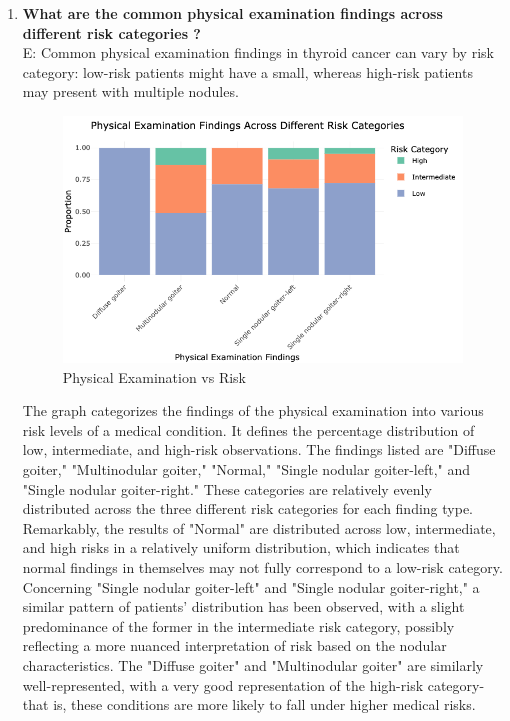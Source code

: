 \documentclass[12pt]{article}
\begin{document}
\begin{enumerate}
\newpage 

 \item \textbf{What are the common physical examination findings across different risk categories ?} \\
 E: Common physical examination findings in thyroid cancer can vary by risk category: low-risk patients might have a small, whereas high-risk patients may present with multiple nodules.

 \begin{figure}[h]
        \centering
        \includegraphics[width=1.1\textwidth]{physical vs risk.png}  
        \caption{Physical Examination vs Risk}
            \label{fig:example}
       \vspace{0.5cm}
    \end{figure}

The graph categorizes the findings of the physical examination into various risk levels of a medical condition. It defines the percentage distribution of low, intermediate, and high-risk observations. The findings listed are "Diffuse goiter," "Multinodular goiter," "Normal," "Single nodular goiter-left," and "Single nodular goiter-right." These categories are relatively evenly distributed across the three different risk categories for each finding type. Remarkably, the results of "Normal" are distributed across low, intermediate, and high risks in a relatively uniform distribution, which indicates that normal findings in themselves may not fully correspond to a low-risk category. Concerning "Single nodular goiter-left" and "Single nodular goiter-right," a similar pattern of patients' distribution has been observed, with a slight predominance of the former in the intermediate risk category, possibly reflecting a more nuanced interpretation of risk based on the nodular characteristics. The "Diffuse goiter" and "Multinodular goiter" are similarly well-represented, with a very good representation of the high-risk category-that is, these conditions are more likely to fall under higher medical risks. 

\end{enumerate}
\end{document}
